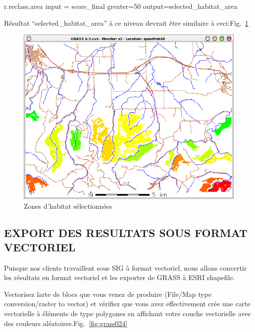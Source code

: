 \begin{smallverbatim}
r.reclass.area input = score_final greater=50 
 output=selected_habitat_area
\end{smallverbatim}

R\'esultat ``selected\_habitat\_area'' \`a ce niveau devrait \^etre similaire \`a ceci:Fig.~\ref{fig:grass023}

\begin{figure}[htbp]
   \centering
   \includegraphics[scale=0.35]{grass023.png}
   \caption{Zones d'habitat s\'electionn\'ees}
   \label{fig:grass023}
\end{figure}

\subsection{EXPORT DES RESULTATS SOUS FORMAT VECTORIEL}
Puisque nos clients travaillent sous SIG \`a format vectoriel, nous allons convertir les r\'esultats en format vectoriel et les exporter de GRASS \`a ESRI shapefile.

Vectorisez larte de blocs que vous venez de produire (File/Map type conversion/raster to vector) et v\'erifiez que vous avez effectivement cr\'ee une carte vectorielle \`a \'el\'ements de type polygones en affichant votre couche vectorielle avec des couleurs al\'eatoires.Fig.~\ref{fig:grass024}

